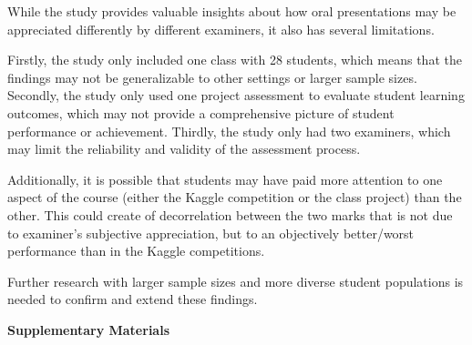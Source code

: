 \documentclass[a4paper]{article}
\begin{document}
	While the study provides valuable insights about how oral presentations may be appreciated differently by different examiners, it also has several limitations.
	
	Firstly, the study only included one class with 28 students, which means that the findings may not be generalizable to other settings or larger sample sizes.
	Secondly, the study only used one project assessment to evaluate student learning outcomes, which may not provide a comprehensive picture of student performance or achievement.
	Thirdly, the study only had two examiners, which may limit the reliability and validity of the assessment process.
	
	Additionally, it is possible that students may have paid more attention to one aspect of the course (either the Kaggle competition or the class project) than the other.
	This could create of decorrelation between the two marks that is not due to examiner's subjective appreciation, but to an objectively better/worst performance than in the Kaggle competitions.
	
	Further research with larger sample sizes and more diverse student populations is needed to confirm and extend these findings.

	
	
	
	
	\begin{center}
		\textbf{\LARGE Supplementary Materials}
	\end{center}
	
\end{document}
